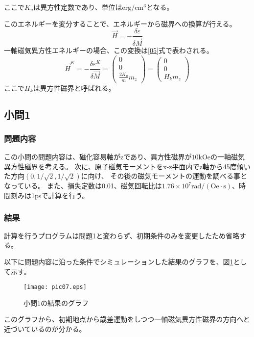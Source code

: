 \documentclass{jsarticle}
\begin{document}
ここで$K_u$は異方性定数であり、単位は$\mathrm{erg/cm^3}$となる。

このエネルギーを変分することで、エネルギーから磁界への換算が行える。
\begin{equation}
	\vec{H} = -\frac{\delta \varepsilon}{\delta \vec{M}}
\end{equation}
一軸磁気異方性エネルギーの場合、この変換は\ref{05}式で表わされる。
\begin{equation}
	\label{05}
	\vec{H}^K = -\frac{\delta \varepsilon^K}{\delta \vec{M}}
	 = \begin{pmatrix}
		 0\\0\\ \frac{2K_u}{m}m_z
	   \end{pmatrix}
	 = \begin{pmatrix}
		 0\\0\\ H_k m_z
	   \end{pmatrix}
\end{equation}
ここで$H_k$は異方性磁界と呼ばれる。

\subsection{小問1}
\subsubsection{問題内容}
この小問の問題内容は、磁化容易軸がzであり、異方性磁界が$10\mathrm{kOe}$の一軸磁気異方性磁界を考える。
次に、原子磁気モーメントをx-z平面内でz軸から45度傾いた方向$(0, 1/\sqrt{2}, 1/\sqrt{2})$に向け、
その後の磁気モーメントの運動を調べる事となっている。
また、損失定数は0.01、磁気回転比は$1.76\times10^7\mathrm{rad/(Oe\cdot s)}$、時間刻みは1psで計算を行う。

\subsubsection{結果}
計算を行うプログラムは問題1と変わらず、初期条件のみを変更したため省略する。

以下に問題内容に沿った条件でシミュレーションした結果のグラフを、図\ref{fig05}として示す。
\begin{figure}[H]
	\centering
	\texttt{[image: pic07.eps]}
	\caption{小問1の結果のグラフ}
	\label{fig05}
\end{figure}

このグラフから、初期地点から歳差運動をしつつ一軸磁気異方性磁界の方向へと近づいているのが分かる。
\end{document}
